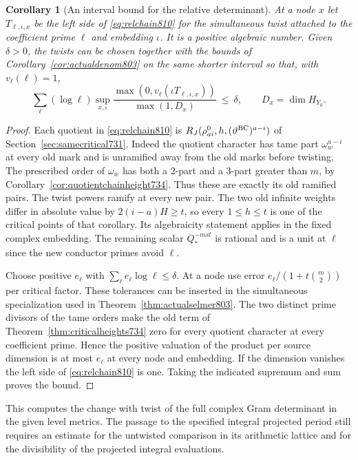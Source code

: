 \documentclass[a4paper,11pt]{article}
\newtheorem{corollary}[proposition]{Corollary}
\theoremstyle{definition}
\theoremstyle{remark}
\numberwithin{equation}{section}
\begin{document}
\begin{corollary}[An interval bound for the relative determinant]
\leavevmode\label{cor:detheight810}
At a node \(x\) let \(T_{\ell,\iota,x}\) be the left side of
\eqref{eq:relchain810} for the simultaneous twist attached to the
coefficient prime \(\ell\) and embedding \(\iota\). It is a positive
algebraic number. Given \(\delta>0\), the twists can be chosen
together with the bounds of Corollary~\ref{cor:actualdenom803}
on the same shorter interval so that, with \(v_\ell(\ell)=1\),
\[
 \sum_\ell(\log\ell)\sup_{x,\iota}
       \frac{\max(0,v_\ell(\iota T_{\ell,\iota,x}))}
            {\max(1,D_x)}\ \leq\ \delta ,
       \qquad D_x=\dim H_{Y_0}.
\]
\end{corollary}
\begin{proof}
Each quotient in \eqref{eq:relchain810} is
\(R_J(\rho_{ai}^0,h,(\vartheta^{\rm BC})^{a-i})\)
of Section~\ref{sec:samecritical731}. Indeed the quotient
character has tame part \(\omega_w^{a-i}\) at every old mark
and is unramified away from the old marks before twisting.
The prescribed order of \(\omega_w\) has both a 2-part and a
3-part greater than \(m\), by
Corollary~\ref{cor:quotientchainheight734}. Thus these are
exactly its old ramified pairs. The twist powers ramify at
every new pair. The two old infinite weights differ in
absolute value by \(2(i-a)H\geq t\), so every \(1\leq h\leq t\)
is one of the critical points of that corollary. Its algebraicity
statement applies in the fixed complex embedding.
The remaining scalar \(Q_*^{-mst}\) is rational and is a unit
at \(\ell\) since the new conductor primes avoid \(\ell\).

Choose positive \(e_\ell\) with
\(\sum_\ell e_\ell\log\ell\leq\delta\). At a node use error
\(e_\ell/(1+t\binom m2)\) per critical factor. These tolerances
can be inserted in the simultaneous specialization used in
Theorem~\ref{thm:actualselmer803}. The two distinct prime
divisors of the tame orders make the old term of
Theorem~\ref{thm:criticalheights734} zero for every quotient
character at every coefficient prime. Hence the positive
valuation of the product per source dimension is at most
\(e_\ell\) at every node and embedding. If the dimension
vanishes the left side of \eqref{eq:relchain810} is one.
Taking the indicated supremum and sum proves the bound.
\end{proof}
This computes the change with twist of the full complex Gram
determinant in the given level metrics. The passage to the
specified integral projected period still requires an estimate
for the untwisted comparison in its arithmetic lattice and for
the divisibility of the projected integral evaluations.
\clearpage
\end{document}
